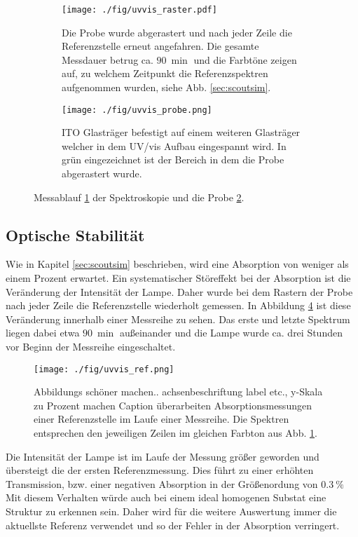 \begin{figure}
    \begin{subfigure}[b]{0.65\textwidth}
      \texttt{[image: ./fig/uvvis\_raster.pdf]}
      \caption{Die Probe wurde abgerastert und nach jeder Zeile die Referenzstelle erneut angefahren. 
      Die gesamte Messdauer betrug ca. $\SI{90}{\min}$ und die Farbtöne zeigen auf, zu welchem Zeitpunkt die Referenzspektren aufgenommen wurden, siehe Abb. \ref{sec:scoutsim}.}
      \label{fig:uvvis_raster}
    \end{subfigure}\hfill
    \begin{subfigure}[b]{0.325\textwidth}
      \texttt{[image: ./fig/uvvis\_probe.png]}
      \caption{ITO Glasträger befestigt auf einem weiteren Glasträger welcher in dem UV/vis Aufbau eingespannt wird. In grün eingezeichnet ist der Bereich in dem die Probe abgerastert wurde.}
      \label{fig:uvvis_probe}
    \end{subfigure}
    \caption{Messablauf \ref{fig:uvvis_raster} der Spektroskopie und die Probe \ref{fig:uvvis_probe}.} 
    \label{fig:uvvis_ablauf}
\end{figure}

\subsection{Optische Stabilität}
Wie in Kapitel \ref{sec:scoutsim} beschrieben, wird eine Absorption von weniger als einem Prozent erwartet.
Ein systematischer Störeffekt bei der Absorption ist die Veränderung der Intensität der Lampe.
Daher wurde bei dem Rastern der Probe nach jeder Zeile die Referenzstelle wiederholt gemessen.
In Abbildung \ref{fig:uvvis_ref} ist diese Veränderung innerhalb einer Messreihe zu sehen.
Das erste und letzte Spektrum liegen dabei etwa $\SI{90}{\min}$ außeinander und die Lampe wurde ca. drei Stunden vor Beginn der Messreihe eingeschaltet.
\begin{figure}
    \centering
    \texttt{[image: ./fig/uvvis\_ref.png]}
    \caption{Abbildungs schöner machen.. achsenbeschriftung label etc., y-Skala zu Prozent machen Caption überarbeiten
    Absorptionsmessungen einer Referenzstelle im Laufe einer Messreihe.
    Die Spektren entsprechen den jeweiligen Zeilen im gleichen Farbton aus Abb. \ref{fig:uvvis_raster}.}
    \label{fig:uvvis_ref}
\end{figure}
Die Intensität der Lampe ist im Laufe der Messung größer geworden und übersteigt die der ersten Referenzmessung. 
Dies führt zu einer erhöhten Transmission, bzw. einer negativen Absorption in der Größenordung von $\SI{0.3}{\%}$
Mit diesem Verhalten würde auch bei einem ideal homogenen Substat eine Struktur zu erkennen sein.
Daher wird für die weitere Auswertung immer die aktuellste Referenz verwendet und so der Fehler in der Absorption verringert.
